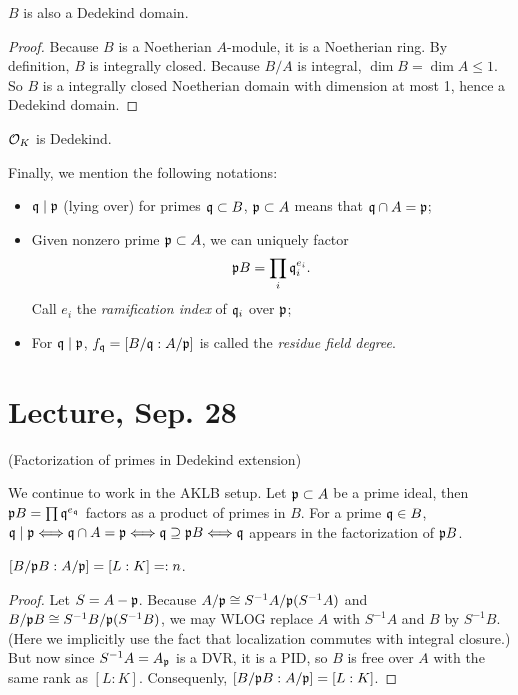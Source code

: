 \documentclass[11pt]{amsart}
\begin{document}
\begin{thm}
$B$ is also a Dedekind domain.
\end{thm}

\begin{proof}
Because $B$ is a Noetherian $A$-module, it is a Noetherian ring. By definition, $B$ is integrally closed. Because $B/A$ is integral, $\dim B = \dim A \le 1$. So $B$ is a integrally closed Noetherian domain with dimension at most 1, hence a Dedekind domain.
\end{proof}

\begin{cor}
$\mathcal{O}_K$ is Dedekind.
\end{cor}

Finally, we mention the following notations: 
\begin{itemize}
    \item $\mathfrak{q}\mid \mathfrak{p}$ (lying over) for primes $\mathfrak{q}\subset B$, $\mathfrak{p}\subset A$ means that $\mathfrak{q}\cap A = \mathfrak{p}$;
    \item Given nonzero prime $\mathfrak{p} \subset A$, we can uniquely factor
\[\mathfrak{p} B = \prod_i \mathfrak{q}_i^{e_i}.\]
Call $e_i$ the \emph{ramification index} of $\mathfrak{q}_i$ over $\mathfrak{p}$;
    \item For $\mathfrak{q}\mid\mathfrak{p}$, $f_{\mathfrak{q}} = [B/\mathfrak{q} : A/\mathfrak{p}]$ is called the \emph{residue field degree}.
\end{itemize} 


\section{Lecture, Sep. 28}

(Factorization of primes in Dedekind extension)

We continue to work in the AKLB setup. Let $\mathfrak{p}\subset A$ be a prime ideal, then $\mathfrak{p} B = \prod \mathfrak{q}^{e_{\mathfrak{q}}}$ factors as a product of primes in $B$. For a prime $\mathfrak{q}\in B$, $\mathfrak{q}\mid \mathfrak{p} \Longleftrightarrow \mathfrak{q}\cap A = \mathfrak{p} \Longleftrightarrow \mathfrak{q} \supseteq \mathfrak{p} B \Longleftrightarrow \mathfrak{q}$ appears in the factorization of $\mathfrak{p} B$.

\begin{prop}
$[B/\mathfrak{p} B : A/\mathfrak{p}] = [L:K] =: n$.
\end{prop}

\begin{proof}
Let $S = A-\mathfrak{p}$. Because $A/\mathfrak{p} \cong S^{-1}A/\mathfrak{p}(S^{-1}A)$ and $B/\mathfrak{p} B \cong S^{-1}B/\mathfrak{p}(S^{-1}B)$, we may WLOG replace $A$ with $S^{-1}A$ and $B$ by $S^{-1}B$. (Here we implicitly use the fact that localization commutes with integral closure.) But now since $S^{-1}A = A_{\mathfrak{p}}$ is a DVR, it is a PID, so $B$ is free over $A$ with the same rank as $[L:K]$. Consequenly, $[B/\mathfrak{p} B: A/\mathfrak{p}] = [L:K]$.
\end{proof}
\end{document}
